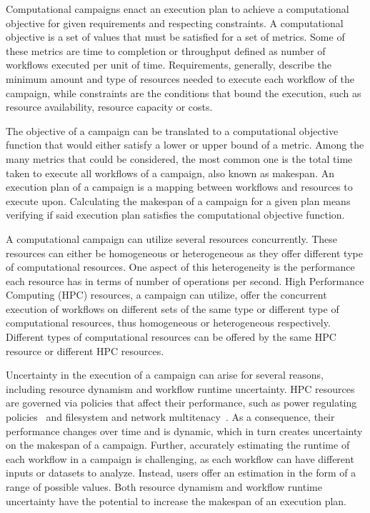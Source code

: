 \label{ch:campaigns}
Computational campaigns enact an execution plan to achieve a computational objective for given requirements and respecting constraints.
A computational objective is a set of values that must be satisfied for a set of metrics.
Some of these metrics are time to completion or throughput defined as number of workflows executed per unit of time.
Requirements, generally, describe the minimum amount and type of resources needed to execute each workflow of the campaign, while constraints are the conditions that bound the execution, such as resource availability, resource capacity or costs.

The objective of a campaign can be translated to a computational objective function that would either satisfy a lower or upper bound of a metric.
Among the many metrics that could be considered, the most common one is the total time taken to execute all workflows of a campaign, also known as makespan.
An execution plan of a campaign is a mapping between workflows and resources to execute upon.
Calculating the makespan of a campaign for a given plan means verifying if said execution plan satisfies the computational objective function.

A computational campaign can utilize several resources concurrently.
These resources can either be homogeneous or heterogeneous as they offer different type of computational resources.
One aspect of this heterogeneity is the performance each resource has in terms of number of operations per second.
High Performance Computing (HPC) resources, a campaign can utilize, offer the concurrent execution of workflows on different sets of the same type or different type of computational resources, thus homogeneous or heterogeneous respectively.
Different types of computational resources can be offered by the same HPC resource or different HPC resources.

Uncertainty in the execution of a campaign can arise for several reasons, including resource dynamism and workflow runtime uncertainty.
HPC resources are governed via policies that affect their performance, such as power regulating policies~\cite{inadomi2015analyzing} and filesystem and network  multitenacy~\cite{brown2018interference}.
As a consequence, their performance changes over time and is dynamic, which in turn creates uncertainty on the makespan of a campaign.
Further, accurately estimating the runtime of each workflow in a campaign is challenging, as each workflow can have different inputs or datasets to analyze.
Instead, users offer an estimation in the form of a range of possible values.
Both resource dynamism and workflow runtime uncertainty have the potential to increase the makespan of an execution plan.


